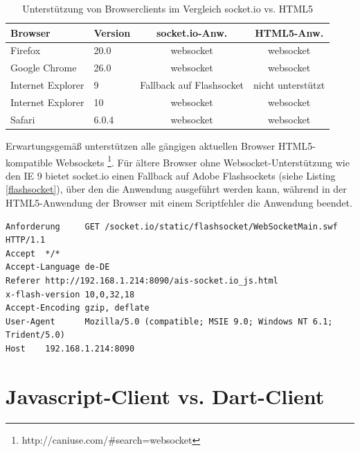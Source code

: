 \begin{table}
\begin{tabular}{ l|l|c|c}
Browser&Version&socket.io-Anw.&HTML5-Anw.\\\hline
Firefox& 20.0&websocket&websocket \\
Google Chrome & 26.0 &websocket&websocket\\
Internet Explorer&9& Fallback auf Flashsocket&nicht unterstützt\\
Internet Explorer&10& websocket&websocket\\
Safari&6.0.4 & websocket&websocket\\
\end{tabular}
\caption[Unterstützung von Browserclients im Vergleich socket.io vs. HTML5]{Unterstützung von Browserclients im Vergleich socket.io vs. HTML5}
\label{Browserclients-Vergleich}
\end{table}
Erwartungsgemäß unterstützen alle gängigen aktuellen Browser HTML5-kompatible Websockets \footnote{http://caniuse.com/\#search=websocket}. Für ältere Browser ohne Websocket-Unterstützung wie den IE 9 bietet socket.io einen Fallback auf Adobe Flashsockets (siehe Listing \ref{flashsocket}), über den die Anwendung ausgeführt werden kann, während in der HTML5-Anwendung der Browser mit einem Scriptfehler die Anwendung beendet.
\begin{lstlisting}[caption=socket.io Client-Request in Internet Explorer 9, label=flashsocket]
Anforderung     GET /socket.io/static/flashsocket/WebSocketMain.swf HTTP/1.1
Accept  */*
Accept-Language de-DE
Referer http://192.168.1.214:8090/ais-socket.io_js.html
x-flash-version 10,0,32,18
Accept-Encoding gzip, deflate
User-Agent      Mozilla/5.0 (compatible; MSIE 9.0; Windows NT 6.1; Trident/5.0)
Host    192.168.1.214:8090                            
\end{lstlisting}

\newpage
\section{Javascript-Client vs. Dart-Client} 
